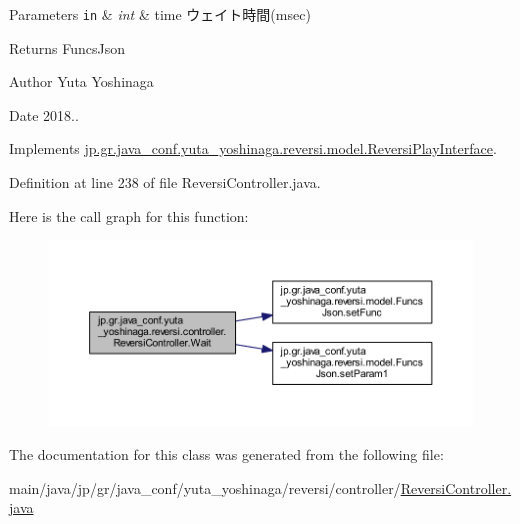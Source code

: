 \begin{DoxyParams}[1]{Parameters}
\mbox{\tt in}  & {\em int} & time ウェイト時間(msec) \\
\hline
\end{DoxyParams}
\begin{DoxyReturn}{Returns}
Funcs\+Json 
\end{DoxyReturn}
\begin{DoxyAuthor}{Author}
Yuta Yoshinaga 
\end{DoxyAuthor}
\begin{DoxyDate}{Date}
2018.. 
\end{DoxyDate}


Implements \hyperlink{interfacejp_1_1gr_1_1java__conf_1_1yuta__yoshinaga_1_1reversi_1_1model_1_1_reversi_play_interface_ad89b0c606489a4a89d2778f7ad4c19dc}{jp.\+gr.\+java\+\_\+conf.\+yuta\+\_\+yoshinaga.\+reversi.\+model.\+Reversi\+Play\+Interface}.



Definition at line 238 of file Reversi\+Controller.\+java.

Here is the call graph for this function\+:
\nopagebreak
\begin{figure}[H]
\begin{center}
\leavevmode
\includegraphics[width=350pt]{classjp_1_1gr_1_1java__conf_1_1yuta__yoshinaga_1_1reversi_1_1controller_1_1_reversi_controller_a4f290c6bccc40ff5239ef8047bb644d8_cgraph}
\end{center}
\end{figure}


The documentation for this class was generated from the following file\+:\begin{DoxyCompactItemize}
\item 
main/java/jp/gr/java\+\_\+conf/yuta\+\_\+yoshinaga/reversi/controller/\hyperlink{_reversi_controller_8java}{Reversi\+Controller.\+java}\end{DoxyCompactItemize}
